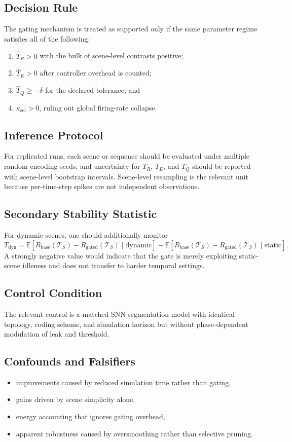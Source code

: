\documentclass[11pt]{article}
\begin{document}
\subsection{Decision Rule}
The gating mechanism is treated as supported only if the same parameter regime satisfies all of the following:
\begin{enumerate}[leftmargin=*]
\item $\widehat{T}_R>0$ with the bulk of scene-level contrasts positive;
\item $\widehat{T}_E>0$ after controller overhead is counted;
\item $\widehat{T}_Q\ge -\delta$ for the declared tolerance; and
\item $\kappa_{\mathrm{sel}}>0$, ruling out global firing-rate collapse.
\end{enumerate}

\subsection{Inference Protocol}
For replicated runs, each scene or sequence should be evaluated under multiple random encoding seeds, and uncertainty for $T_R$, $T_E$, and $T_Q$ should be reported with scene-level bootstrap intervals. Scene-level resampling is the relevant unit because per-time-step spikes are not independent observations.

\subsection{Secondary Stability Statistic}
For dynamic scenes, one should additionally monitor
\[
T_{\mathrm{dyn}}=
\mathbb{E}\!\left[R_{\mathrm{base}}(\mathcal{T}_S)-R_{\mathrm{gated}}(\mathcal{T}_S)\mid \text{dynamic}\right]
-
\mathbb{E}\!\left[R_{\mathrm{base}}(\mathcal{T}_S)-R_{\mathrm{gated}}(\mathcal{T}_S)\mid \text{static}\right].
\]
A strongly negative value would indicate that the gate is merely exploiting static-scene idleness and does not transfer to harder temporal settings.

\subsection{Control Condition}
The relevant control is a matched SNN segmentation model with identical topology, coding scheme, and simulation horizon but without phase-dependent modulation of leak and threshold.

\subsection{Confounds and Falsifiers}
\begin{itemize}[leftmargin=*]
\item improvements caused by reduced simulation time rather than gating,
\item gains driven by scene simplicity alone,
\item energy accounting that ignores gating overhead,
\item apparent robustness caused by oversmoothing rather than selective pruning.
\end{itemize}
\end{document}
